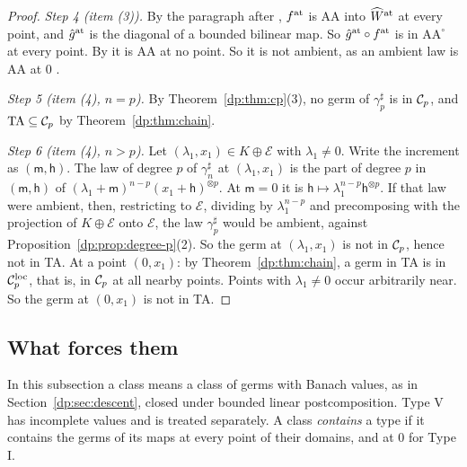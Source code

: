 \begin{proof}
\emph{Step 4 (item (3)).} By the paragraph after \cite[Theorem~14.17]{I}, $f^{\rm at}$ is AA into $\widehat W^{\rm at}$ at every point, and $\hat g^{\rm at}$ is the diagonal of a bounded bilinear map. So $\hat g^{\rm at}\circ f^{\rm at}$ is in $\mathrm{AA}^\circ$ at every point. By \cite[Theorem~14.17]{I} it is AA at no point. So it is not ambient, as an ambient law is AA at $0$ \cite[Proposition~14.9(1)]{I}.

\emph{Step 5 (item (4), $n=p$).} By Theorem~\ref{dp:thm:cp}(3), no germ of $\gamma^\sharp_p$ is in $\mathcal{C}_p$, and $\mathrm{TA}\subseteq\mathcal{C}_p$ by Theorem~\ref{dp:thm:chain}.

\emph{Step 6 (item (4), $n>p$).} Let $(\lambda_1,x_1)\in K\oplus\mathcal E$ with $\lambda_1\ne0$. Write the increment as $(\mathsf m,\mathsf h)$. The law of degree $p$ of $\gamma^\sharp_n$ at $(\lambda_1,x_1)$ is the part of degree $p$ in $(\mathsf m,\mathsf h)$ of $(\lambda_1+\mathsf m)^{n-p}(x_1+\mathsf h)^{\otimes p}$. At $\mathsf m=0$ it is $\mathsf h\mapsto\lambda_1^{n-p}\mathsf h^{\otimes p}$. If that law were ambient, then, restricting to $\mathcal E$, dividing by $\lambda_1^{n-p}$ and precomposing with the projection of $K\oplus\mathcal E$ onto $\mathcal E$, the law $\gamma^\sharp_p$ would be ambient, against Proposition~\ref{dp:prop:degree-p}(2). So the germ at $(\lambda_1,x_1)$ is not in $\mathcal{C}_p$, hence not in TA. At a point $(0,x_1)$: by Theorem~\ref{dp:thm:chain}, a germ in TA is in $\mathcal{C}_p^{\rm loc}$, that is, in $\mathcal{C}_p$ at all nearby points. Points with $\lambda_1\ne0$ occur arbitrarily near. So the germ at $(0,x_1)$ is not in TA.
\end{proof}

\subsection{What forces them}\label{dp:ssec:forcing}

In this subsection a class means a class of germs with Banach values, as in Section~\ref{dp:sec:descent}, closed under bounded linear postcomposition. Type V has incomplete values and is treated separately. A class \emph{contains} a type if it contains the germs of its maps at every point of their domains, and at $0$ for Type I.

